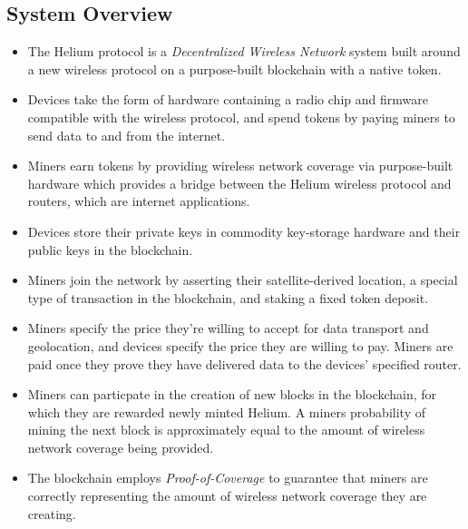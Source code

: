 \documentclass[letterpaper,11pt]{article}
\def\proofofcoverage/{\textit{Proof-of-Coverage}}
\begin{document}
\subsection{System Overview}

\begin{itemize}
	\item The Helium protocol is a \textit{Decentralized Wireless Network} system built around a new wireless protocol on a purpose-built blockchain with a native token.
	\item Devices take the form of hardware containing a radio chip and firmware compatible with the wireless protocol, and spend tokens by paying miners to send data to and from the internet.
	\item Miners earn tokens by providing wireless network coverage via purpose-built hardware which provides a bridge between the Helium wireless protocol and routers, which are internet applications.
	\item Devices store their private keys in commodity key-storage hardware and their public keys in the blockchain.
	\item Miners join the network by asserting their satellite-derived location, a special type of transaction in the blockchain, and staking a fixed token deposit.
	\item Miners specify the price they're willing to accept for data transport and geolocation, and devices specify the price they are willing to pay. Miners are paid once they prove they have delivered data to the devices' specified router.
	\item Miners can particpate in the creation of new blocks in the blockchain, for which they are rewarded newly minted Helium. A miners probability of mining the next block is approximately equal to the amount of wireless network coverage being provided.
	\item The blockchain employs \proofofcoverage/ to guarantee that miners are correctly representing the amount of wireless network coverage they are creating.
\end{itemize}
\end{document}
